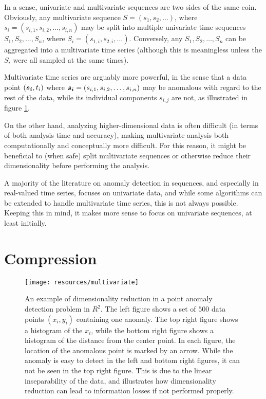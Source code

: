 In a sense, univariate and multivariate sequences are two sides of the same coin. Obviously, any multivariate sequence $S = (s_1, s_2, \dots)$, where $s_i = (s_{i,1}, s_{i,2}, \dots, s_{i,n})$ may be split into multiple univariate time sequences $S_1, S_2, \dots, S_n$, where $S_i = (s_{1,i}, s_{2, i}, \dots ).$ Conversely, any $S_1, S_2, \dots, S_n$ can be aggregated into a multivariate time series (although this is meaningless unless the $S_i$ were all sampled at the same times).

Multivariate time series are arguably more powerful, in the sense that a data point $(\boldsymbol{s_i}, t_i)$ where $\boldsymbol{s_i} = (s_{i,1}, s_{i,2}, \dots, s_{i,n})$ may be anomalous with regard to the rest of the data, while its individual components $s_{i,j}$ are not, as illustrated in figure \ref{fig:dimensionality_reduction}.

On the other hand, analyzing higher-dimensional data is often difficult (in terms of both analysis time and accuracy), making multivariate analysis both computationally and conceptually more difficult. For this reason, it might be beneficial to (when safe) split multivariate sequences or otherwise reduce their dimensionality before performing the analysis. 

A majority of the literature on anomaly detection in sequences, and especially in real-valued time series, focuses on univariate data, and while some algorithms can be extended to handle multivariate time series, this is not always possible. Keeping this in mind, it makes more sense to focus on univariate sequences, at least initially.

\section{Compression}
\label{sect:compression}

\begin{figure}[htb]
\begin{center}
\leavevmode
\texttt{[image: resources/multivariate]}
\end{center}
\caption{\small{An example of dimensionality reduction in a point anomaly detection problem in $R^2$. The left figure shows a set of $500$ data points $(x_i, y_i)$ containing one anomaly. The top right figure shows a histogram of the $x_i$, while the bottom right figure shows a histogram of the distance from the center point. In each figure, the location of the anomalous point is marked by an arrow. While the anomaly is easy to detect in the left and bottom right figures, it can not be seen in the top right figure. This is due to the linear inseparability of the data, and illustrates how dimensionality reduction can lead to information losses if not performed properly.}}
\label{fig:dimensionality_reduction}
\end{figure}


